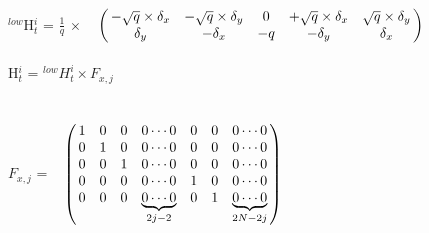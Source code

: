 \documentclass{ba-kecs}
\numberwithin{figure}{section}
\numberwithin{equation}{section}
\begin{document}
$^{low}$H$^{i}_{t}$ = $\frac{1}{q}$ $\times$ $\bordermatrix{~ \cr
                                & -\sqrt{q} \times \delta_{x} & -\sqrt{q} \times \delta_{y} & 0 & +\sqrt{q} \times \delta_{x} & \sqrt{q} \times \delta_{y} \cr
                                & \delta_{y} & -\delta_{x} & -q & -\delta_{y} & \delta_{x}} $\\ \\
                                                  
H$^{i}_{t}$ = $^{low}H^{i}_{t} \times F_{x,j}$
\\ \\
$F_{x,j}$ = $\bordermatrix{~ \cr
                        & 1 & 0 & 0 & 0 \cdots 0 & 0 & 0 & 0 \cdots 0 \cr
                        & 0 & 1 & 0 & 0 \cdots 0 & 0 & 0 & 0 \cdots 0 \cr
                        & 0 & 0 & 1 & 0 \cdots 0 & 0 & 0 & 0 \cdots 0 \cr
                        & 0 & 0 & 0 & 0 \cdots 0 & 1 & 0 & 0 \cdots 0 \cr
                        & 0 & 0 & 0 & \underbrace{0 \cdots 0}_{2j-2} & 0 & 1 & \underbrace{0 \cdots 0}_{2N-2j} \cr}$
\end{document}
